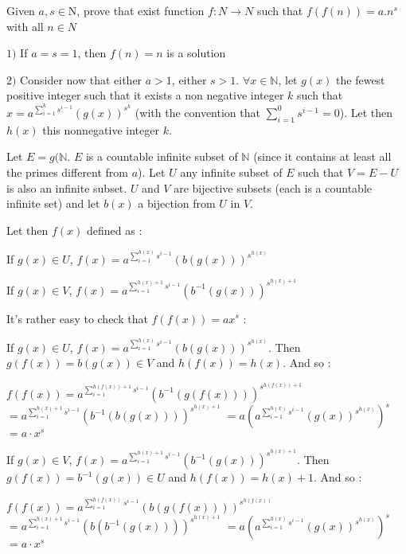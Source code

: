 \begin{mysolution}
	\begin{tcolorbox}Given $ a,s \in$N, prove that exist function $ f: N \rightarrow N$ such that $ f(f(n)) = a.n^{s}$ with all $ n \in N$\end{tcolorbox}

$ 1)$ If $ a=s=1$, then $ f(n)=n$ is a solution

$ 2)$ Consider now that either $ a>1$, either $ s>1$.
$ \forall x\in\mathbb{N}$, let $ g(x)$ the fewest positive integer such that it exists a non negative integer $ k$ such that $ x=a^{\sum_{i=1}^k s^{i-1}}(g(x))^{s^k}$ (with the convention that $ \sum_{i=1}^0 s^{i-1}=0$). Let then $ h(x)$ this nonnegative integer $ k$.

Let $ E=g(\mathbb{N}$. $ E$ is a countable infinite subset of $ \mathbb{N}$ (since it contains at least all the primes different from $ a$).
Let $ U$ any infinite subset of $ E$ such that $ V=E-U$ is also an infinite subset. $ U$ and $ V$ are bijective subsets (each is a countable infinite set) and let $ b(x)$ a bijection from $ U$ in $ V$.

Let then $ f(x)$ defined as :

If $ g(x)\in U$, $ f(x)=a^{\sum_{i=1}^{h(x)} s^{i-1}}(b(g(x)))^{s^{h(x)}}$

If $ g(x)\in V$, $ f(x)=a^{\sum_{i=1}^{h(x)+1} s^{i-1}}(b^{-1}(g(x)))^{s^{h(x)+1}}$

It's rather easy to check that $ f(f(x))=ax^s$ :

If $ g(x)\in U$, $ f(x)=a^{\sum_{i=1}^{h(x)} s^{i-1}}(b(g(x)))^{s^{h(x)}}$. Then $ g(f(x))=b(g(x))\in V$ and $ h(f(x))=h(x)$. And so :

$ f(f(x))=a^{\sum_{i=1}^{h(f(x))+1} s^{i-1}}(b^{-1}(g(f(x))))^{s^{h(f(x))+1}}$ $ =a^{\sum_{i=1}^{h(x)+1} s^{i-1}}(b^{-1}(b(g(x))))^{s^{h(x)+1}}$ $ =a(a^{\sum_{i=1}^{h(x)} s^{i-1}}(g(x))^{s^{h(x)}})^s$ $ =a\cdot x^s$

If $ g(x)\in V$, $ f(x)=a^{\sum_{i=1}^{h(x)+1} s^{i-1}}(b^{-1}(g(x)))^{s^{h(x)+1}}$. Then $ g(f(x))=b^{-1}(g(x))\in U$ and $ h(f(x))=h(x)+1$. And so :

$ f(f(x))=a^{\sum_{i=1}^{h(f(x))} s^{i-1}}(b(g(f(x))))^{s^{h(f(x))}}$ $ =a^{\sum_{i=1}^{h(x)+1} s^{i-1}}(b(b^{-1}(g(x))))^{s^{h(x)+1}}$ $ =a(a^{\sum_{i=1}^{h(x)} s^{i-1}}(g(x))^{s^{h(x)}})^s$ $ =a\cdot x^s$
\end{mysolution}



